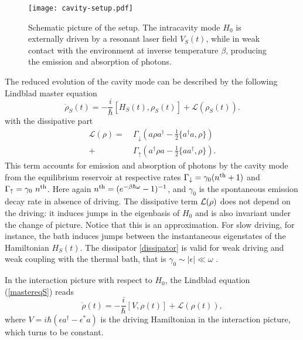 \documentclass[aps,prx,twocolumn,showpacs,floatfix,superscriptaddress,graphics,longbibliography]{revtex4-1}
\begin{document}
\begin{figure}[t]
\begin{center}
\texttt{[image: cavity-setup.pdf]}
\caption{Schematic picture of the setup. The intracavity mode $H_0$ is externally driven by a resonant laser field $V_S(t)$, 
while in weak contact with the environment at inverse temperature $\beta$, producing the emission and absorption of photons.} 
\label{F-cavity}
\end{center}
\end{figure}

The reduced evolution of the cavity mode can be described by the following Lindblad master equation  \cite{Wiseman}
\begin{equation}\label{mastereqS}
\dot{\rho}_S(t) = - \frac{i}{\hbar}[H_S(t), \rho_S(t) ] + \mathcal{L}(\rho_S(t)).
\end{equation}
with the dissipative part
\begin{align} \label{dissipator}
\mathcal{L}(\rho) =~ & \Gamma_\downarrow \left(a \rho a^\dagger - \frac{1}{2} \{a^\dagger a, \rho \}\right) \nonumber \\ 
 +~ & \Gamma_\uparrow \left(a^\dagger \rho a - \frac{1}{2} \{a a^\dagger, \rho \} \right).
\end{align}  
This term accounts for emission and absorption of photons by the cavity mode from the equilibrium reservoir at respective rates $\Gamma_\downarrow = \gamma_0 (n^{\rm th} + 1)$ and 
$\Gamma_\uparrow = \gamma_0 ~n^{\rm th}$. Here again $n^{\rm th} = (e^{-\beta \hbar \omega}- 1)^{-1}$, and $\gamma_0$ is the spontaneous emission decay rate 
in absence of driving. The dissipative term ${\cal L}(\rho)$ does not depend on the driving: it induces jumps in the eigenbasis of $H_0$ and is also invariant under the change of picture. Notice that this is an approximation. For slow driving, for instance, the bath induces jumps between the instantaneous eigenstates of the Hamiltonian $H_S(t)$. The dissipator \eqref{dissipator} is valid for weak driving and weak coupling with the thermal bath, that is $\gamma_0 \sim |\epsilon| \ll \omega$ \cite{rivas2010}. 

In the interaction picture with respect to $H_0$,  the Lindblad equation (\ref{mastereqS}) reads  \cite{Wiseman}
\begin{equation}\label{mastereq}
\dot{\rho}(t) = - \frac{i}{\hbar}[V, \rho(t) ] + \mathcal{L}(\rho(t)),
\end{equation}
where $V = i \hbar(\epsilon a^\dagger - \epsilon^{\ast} a)$ is the driving Hamiltonian in the interaction picture, which turns 
to be constant.
\end{document}
